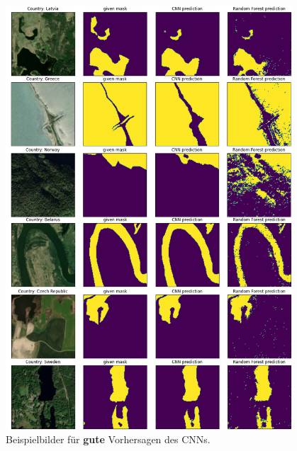 \begin{figure}
    \centering
    \caption{Beispielbilder für \textbf{gute} Vorhersagen des CNNs.\cite{mapbox}\cite{openstreetmap}}
    \label{fig:ergebnisse_gut}
    \includegraphics[width=0.95\textwidth]{content/img/ergebnisse_gut.png}
\end{figure}

